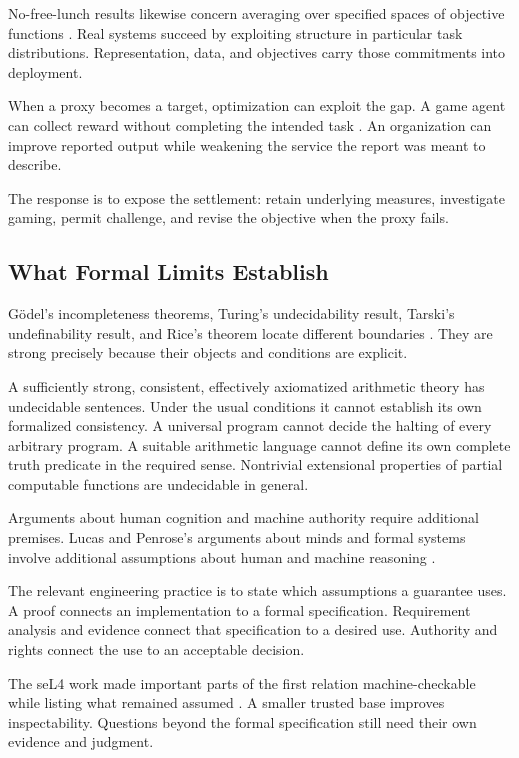 \documentclass[11pt,openany]{book}
\begin{document}
No-free-lunch results likewise concern averaging over specified spaces of objective functions \cite{wolpert1997no}. Real systems succeed by exploiting structure in particular task distributions. Representation, data, and objectives carry those commitments into deployment.

When a proxy becomes a target, optimization can exploit the gap. A game agent can collect reward without completing the intended task \cite{amodei2016concrete}. An organization can improve reported output while weakening the service the report was meant to describe.

The response is to expose the settlement: retain underlying measures, investigate gaming, permit challenge, and revise the objective when the proxy fails.

\subsection{What Formal Limits Establish}

Gödel's incompleteness theorems, Turing's undecidability result, Tarski's undefinability result, and Rice's theorem locate different boundaries \cite{godel1931,turing1936,tarski1936wahrheitsbegriff,rice1953classes}. They are strong precisely because their objects and conditions are explicit.

A sufficiently strong, consistent, effectively axiomatized arithmetic theory has undecidable sentences. Under the usual conditions it cannot establish its own formalized consistency. A universal program cannot decide the halting of every arbitrary program. A suitable arithmetic language cannot define its own complete truth predicate in the required sense. Nontrivial extensional properties of partial computable functions are undecidable in general.

Arguments about human cognition and machine authority require additional premises. Lucas and Penrose's arguments about minds and formal systems involve additional assumptions about human and machine reasoning \cite{lucas1961minds,penrose1989emperor}.

The relevant engineering practice is to state which assumptions a guarantee uses. A proof connects an implementation to a formal specification. Requirement analysis and evidence connect that specification to a desired use. Authority and rights connect the use to an acceptable decision.

The seL4 work made important parts of the first relation machine-checkable while listing what remained assumed \cite{klein2009sel4}. A smaller trusted base improves inspectability. Questions beyond the formal specification still need their own evidence and judgment.
\end{document}

